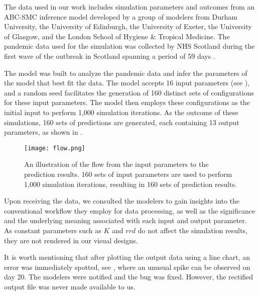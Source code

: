 The data used in our work includes simulation parameters and outcomes from an \ac{ABC-SMC} inference model \cite{toni2008Approximate} developed by a group of modelers from Durham University, the University of Edinburgh, the University of Exeter, the University of Glasgow, and the London School of Hygiene \& Tropical Medicine.
The pandemic data used for the simulation was collected by NHS Scotland during the first wave of the outbreak in Scotland spanning a period of 59 days \cite{2020Covid19}.

\begin{samepage}
The model was built to analyze the pandemic data and infer the parameters of the model that best fit the data.
The model accepts 16 input parameters (see ), and a random seed facilitates the generation of 160 distinct sets of configurations for these input parameters.
The model then employs these configurations as the initial input to perform 1,000 simulation iterations. As the outcome of these simulations, 160 sets of predictions are generated, each containing 13 output parameters, as shown in .

\begin{figure}[tb!]
    \centering
    \texttt{[image: flow.png]}
    \caption{An illustration of the flow from the input parameters to the prediction results. 160 sets of input parameters are used to perform 1,000 simulation iterations, resulting in 160 sets of prediction results.
    }
    \label{fig:flow}
\end{figure}

\end{samepage}



Upon receiving the data, we consulted the modelers to gain insights into the conventional workflow they employ for data processing, as well as the significance and the underlying meaning associated with each input and output parameter. As constant parameters such as $K$ and $rrd$ do not affect the simulation results, they are not rendered in our visual designs.

It is worth mentioning that after plotting the output data using a line chart, an error was immediately spotted, see , where an unusual spike can be observed on day 20.
The modelers were notified and the bug was fixed.
However, the rectified output file was never made available to us.
